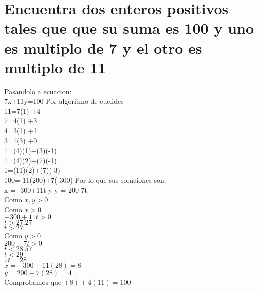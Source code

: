 \section{Encuentra dos enteros positivos tales que que su suma es 100 y uno es multiplo de 7 y el otro es multiplo de 11}
Pasandolo a ecuacion: \\
7x+11y=100
Por algoritmo de euclides \\
11=7(1)  +4\\
7=4(1)  +3\\
4=3(1)  +1\\
3=1(3)  +0\\
1=(4)(1)+(3)(-1)\\
1=(4)(2)+(7)(-1)\\
1=(11)(2)+(7)(-3)\\
100= 11(200)+7(-300)
Por lo que sus soluciones son:\\
x = -300+11t y y = 200-7t\\
Como $x, y> 0$\\
Como $x>0$\\
$-300+11t>0$\\
$t>27.27$\\
$t>27$\\
Como $y>0$\\
$200-7t>0$\\
$t<28.57$\\
$t<29$\\
$\therefore t = 28$\\
$x = -300+11(28)= 8$\\
$y = 200-7(28)= 4$\\
Comprobamos que $(8)+ 4(11) =100$
